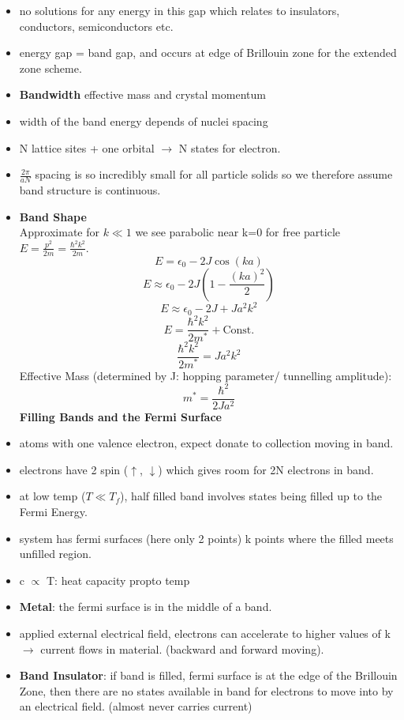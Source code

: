 \begin{itemize}
    \item no solutions for any energy in this gap which relates to insulators, conductors, semiconductors etc.
    \item energy gap = band gap, and occurs at edge of Brillouin zone for the extended zone scheme.
    \item \textbf{Bandwidth} effective mass and crystal momentum
    \item width of the band energy depends of nuclei spacing
    \item N lattice sites + one orbital $\rightarrow$ N states for electron.
    \item $\frac{2 \pi}{aN}$ spacing is so incredibly small for all particle solids so we therefore assume band structure is continuous.
    \item \textbf{Band Shape}\\
    Approximate for $k\ll 1$ we see parabolic near k=0 for free particle $E=\frac{p^2}{2m} = \frac{\hbar^2k^2}{2m}$.
    \[E = \epsilon_0 -2J \cos(ka)\]
    \[E \approx \epsilon_0 - 2J(1-\frac{(ka)^2}{2})\]
    \[E \approx \epsilon_0 -2J + Ja^2k^2 \]
    \[E = \frac{\hbar^2 k^2}{2m^*}+ \text{Const.}\]
    \[\frac{\hbar^2 k^2}{2m^*} = Ja^2 k^2 \]
    Effective Mass (determined by J: hopping parameter/ tunnelling amplitude):
    \[ m^* = \frac{\hbar^2}{2Ja^2} \]
    \textbf{Filling Bands and the Fermi Surface}
    \item atoms with one valence electron, expect donate to collection moving in band.
    \item electrons have 2 spin ($\uparrow$, $\downarrow$) which gives room for 2N electrons in band.
    \item at low temp ($ T \ll T_f$), half filled band involves states being filled up to the Fermi Energy.
    \item system has fermi surfaces (here only 2 points) k points where the filled meets unfilled region.
    \item c $\propto$ T: heat capacity propto temp
    \item \textbf{Metal}: the fermi surface is in the middle of a band.
    \item applied external electrical field, electrons can accelerate to higher values of k $\rightarrow$ current flows in material. (backward and forward moving).
    \item \textbf{Band Insulator}: if band is filled, fermi surface is at the edge of the Brillouin Zone, then there are no states available in band for electrons to move into by an electrical field. (almost never carries current)

\end{itemize}

